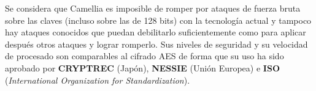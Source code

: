 \documentclass[a4paper, 11pt]{article}
\begin{document}
		Se considera que Camellia es imposible de romper por ataques de fuerza bruta sobre las claves (incluso sobre las de
		128 bits) con la tecnología actual y tampoco hay ataques conocidos que puedan debilitarlo suficientemente como para
		aplicar después otros ataques y lograr romperlo. Sus niveles de seguridad y su velocidad de procesado son comparables
		al cifrado AES de forma que su uso ha sido aprobado por \textbf{CRYPTREC} (Japón), \textbf{NESSIE} (Unión Europea)
		e \textbf{ISO} (\textit{International Organization for Standardization}).
	
\end{document}
